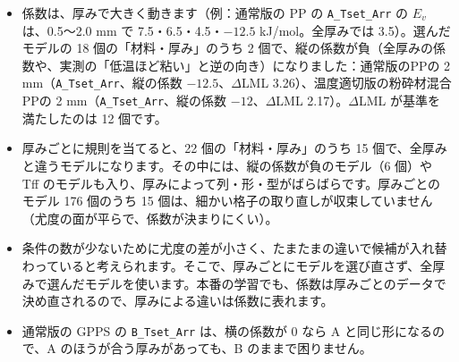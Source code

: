\documentclass[paper=a4paper,fontsize=10.5pt,line_length=44zw,number_of_lines=40]{jlreq}
\begin{document}
\begin{itemize}[itemsep=0.3ex,topsep=0.4ex]
\item 係数は、厚みで大きく動きます（例：通常版の PP の \texttt{A\_\allowbreak{}Tset\_\allowbreak{}Arr} の $E_v$ は、0.5〜2.0 mm で 7.5・6.5・4.5・$-12.5$ kJ/mol。全厚みでは 3.5）。選んだモデルの 18 個の「材料・厚み」のうち 2 個で、縦の係数が負（全厚みの係数や、実測の「低温ほど粘い」と逆の向き）になりました：通常版のPPの 2 mm（\texttt{A\_\allowbreak{}Tset\_\allowbreak{}Arr}、縦の係数 $-12.5$、$\Delta$LML 3.26）、温度適切版の粉砕材混合 PPの 2 mm（\texttt{A\_\allowbreak{}Tset\_\allowbreak{}Arr}、縦の係数 $-12$、$\Delta$LML 2.17）。$\Delta$LML が基準を満たしたのは 12 個です。
\item 厚みごとに規則を当てると、22 個の「材料・厚み」のうち 15 個で、全厚みと違うモデルになります。その中には、縦の係数が負のモデル（6 個）や Tff のモデルも入り、厚みによって列・形・型がばらばらです。厚みごとのモデル 176 個のうち 15 個は、細かい格子の取り直しが収束していません（尤度の面が平らで、係数が決まりにくい）。
\item 条件の数が少ないために尤度の差が小さく、たまたまの違いで候補が入れ替わっていると考えられます。そこで、厚みごとにモデルを選び直さず、全厚みで選んだモデルを使います。本番の学習でも、係数は厚みごとのデータで決め直されるので、厚みによる違いは係数に表れます。
\item 通常版の GPPS の \texttt{B\_\allowbreak{}Tset\_\allowbreak{}Arr} は、横の係数が 0 なら A と同じ形になるので、A のほうが合う厚みがあっても、B のままで困りません。
\end{itemize}
\end{document}
